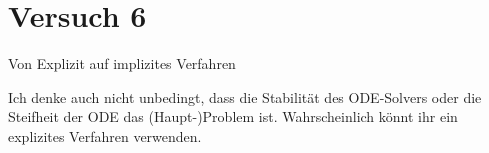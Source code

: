 \newpage
\section{Versuch 6}
Von Explizit auf implizites Verfahren

Ich denke auch nicht unbedingt, dass die Stabilität des ODE-Solvers oder die Steifheit der ODE das (Haupt-)Problem ist. Wahrscheinlich könnt ihr ein explizites Verfahren verwenden.











%
%
%
%
%
%
%
%
%
%
%
%
%
%
%
%
